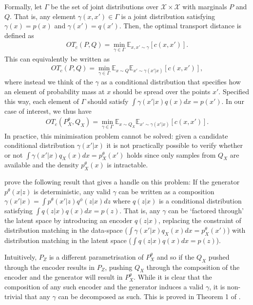 Formally, let $\Gamma$ be the set of joint distributions over $\mathcal{X} \times \mathcal{X}$ with marginals $P$ and $Q$. 
That is, any element $\gamma(x, x') \in \Gamma$ is a joint distribution satisfying $\gamma(x) = p(x)$ and $\gamma(x') = q(x')$.
Then, the optimal transport distance is defined as
%
\begin{align*}
OT_c(P, Q) = \min_{\gamma \in \Gamma} \mathbb{E}_{x, x' \sim \gamma} \left[ c(x, x') \right].
\end{align*}
%
This can equivalently be written as
%
\begin{align*}
OT_c(P, Q) = \min_{\gamma \in \Gamma} \mathbb{E}_{x\sim Q} \mathbb{E}_{x'\sim \gamma(x'|x)} \left[ c(x, x') \right],
\end{align*}
%
where instead we think of the $\gamma$ as a conditional distribution that specifies how an element of probability mass at $x$ should be spread over the points $x'$. 
Specified this way, each element of $\Gamma$ should satisfy $\int \gamma(x'|x) q(x) dx = p(x')$.
In our case of interest, we thus have
%
\begin{align*}
OT_c(P_X^\theta, Q_X) = \min_{\gamma \in \Gamma} \mathbb{E}_{x\sim Q_X} \mathbb{E}_{x'\sim \gamma(x'|x)} \left[ c(x, x') \right].
\end{align*}
%
In practice, this minimisation problem cannot be solved: given a candidate conditional distribution $\gamma(x'|x)$ it is not practically possible to verify whether or not $\int \gamma(x'|x) q_X(x) dx = p_X^\theta(x')$ holds since only samples from $Q_X$ are available and the density $p^\theta_X(x)$ is intractable.

\cite{tolstikhin} prove the following result that gives a handle on this problem:
If the generator $p^\theta(x|z)$ is deterministic, any valid $\gamma$ can be written as a composition $\gamma(x'|x) = \int p^\theta(x'|z) q^\phi(z|x) dz$ where $q(z|x)$ is a conditional distribution satisfying $\int q(z|x) q(x) dx = p(z)$. 
That is, any $\gamma$ can be `factored through' the latent space by introducing an encoder $q(z|x)$, replacing the constraint of distribution matching in the data-space ($\int \gamma(x'|x) q_X(x) dx = p_X^\theta(x')$) with distribution matching in the latent space ($\int q(z|x) q(x) dx = p(z)$).

Intuitively, $P_Z$ is a different parametrisation of $P_X^\theta$ and so if the $Q_X$ pushed through the encoder results in $P_Z$, pushing $Q_X$ through the composition of the encoder and the generator will result in $P_X^\theta$. 
While it is clear that the composition of any such encoder and the generator induces a valid $\gamma$, it is non-trivial that any $\gamma$ can be decomposed as such. 
This is proved in Theorem 1 of \cite{tolstikhin}.

